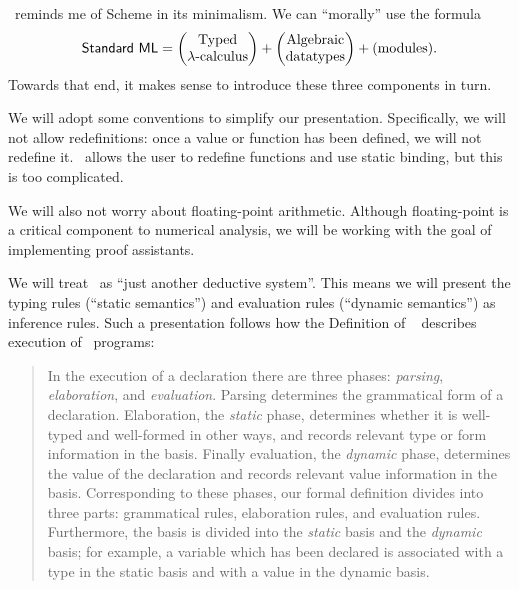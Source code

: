 \begin{node}\label{sml-0000}%
\SML\ reminds me of Scheme in its minimalism. We can ``morally'' use the
formula
\begin{equation*}
\mbox{\textsf{Standard ML}}=\begin{pmatrix}
\mbox{Typed}\\
\lambda\mbox{-calculus}
\end{pmatrix} + \begin{pmatrix}\mbox{Algebraic}\\
\mbox{datatypes}
\end{pmatrix} + (\mbox{modules}).
\end{equation*}
Towards that end, it makes sense to introduce these three components in turn.
\end{node}%
\begin{node}[Conventions]\label{sml-0001}%
We will adopt some conventions to simplify our
presentation. Specifically, we will not allow redefinitions: once a
value or function has been defined, we will not redefine
it. \SML\ allows the user to redefine functions and use static binding,
but this is too complicated.

We will also not worry about floating-point arithmetic. Although
floating-point is a critical component to numerical analysis, we will be
working with the goal of implementing proof assistants.
\end{node}
\begin{node}\label{sml-0002}%
We will treat \SML\ as ``just another deductive system''. This means we
will present the typing rules (``static semantics'') and evaluation
rules (``dynamic semantics'') as inference rules. Such a presentation
follows how the Definition of \SML~\cite[\S1]{milner1997definition}
describes execution of \SML\ programs:
\begin{quote}
In the execution of a declaration there are three phases:
\emph{parsing}, \emph{elaboration}, and \emph{evaluation}. Parsing
determines the grammatical form of a declaration. Elaboration, the
\emph{static} phase, determines whether it is well-typed and well-formed
in other ways, and records relevant type or form information in the
basis. Finally evaluation, the \emph{dynamic} phase, determines the
value of the declaration and records relevant value information in the
basis. Corresponding to these phases, our formal definition divides into
three parts: grammatical rules, elaboration rules, and evaluation
rules. Furthermore, the basis is divided into the \emph{static} basis
and the \emph{dynamic} basis; for example, a variable which has been
declared is associated with a type in the static basis and with a value
in the dynamic basis.
\end{quote}
\end{node}

